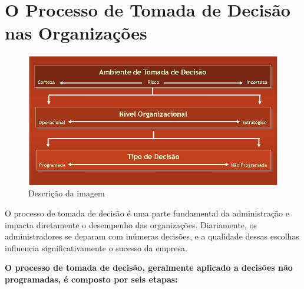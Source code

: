 \section{O Processo de Tomada de Decisão nas Organizações}

\begin{figure}[H]  %
    \centering
    \begin{minipage}{0.6\textwidth}
        \centering
        \includegraphics[width=\textwidth]{img/imagem5.png}
        \caption{Descrição da imagem}
        \label{fig:exemplo}
    \end{minipage}
\end{figure}

O processo de tomada de decisão é uma parte fundamental da administração e impacta diretamente o desempenho das organizações. Diariamente, os administradores se deparam com inúmeras decisões, e a qualidade dessas escolhas influencia significativamente o sucesso da empresa. 

\textbf{O processo de tomada de decisão, geralmente aplicado a decisões não programadas, é composto por seis etapas:}


